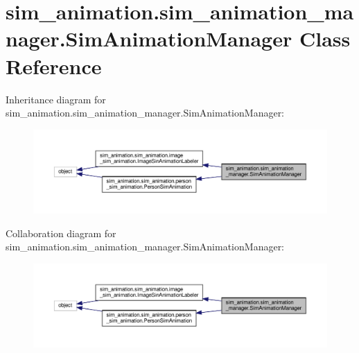 \hypertarget{classsim__animation_1_1sim__animation__manager_1_1SimAnimationManager}{}\section{sim\+\_\+animation.\+sim\+\_\+animation\+\_\+manager.\+Sim\+Animation\+Manager Class Reference}
\label{classsim__animation_1_1sim__animation__manager_1_1SimAnimationManager}


Inheritance diagram for sim\+\_\+animation.\+sim\+\_\+animation\+\_\+manager.\+Sim\+Animation\+Manager\+:
\nopagebreak
\begin{figure}[H]
\begin{center}
\leavevmode
\includegraphics[width=350pt]{classsim__animation_1_1sim__animation__manager_1_1SimAnimationManager__inherit__graph}
\end{center}
\end{figure}


Collaboration diagram for sim\+\_\+animation.\+sim\+\_\+animation\+\_\+manager.\+Sim\+Animation\+Manager\+:
\nopagebreak
\begin{figure}[H]
\begin{center}
\leavevmode
\includegraphics[width=350pt]{classsim__animation_1_1sim__animation__manager_1_1SimAnimationManager__coll__graph}
\end{center}
\end{figure}
